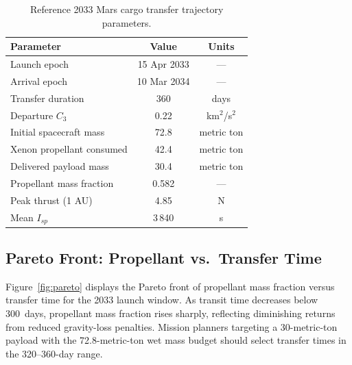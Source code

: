 \documentclass{aiaa-tc}
\begin{document}
\begin{table}[h]
  \centering
  \caption{Reference 2033 Mars cargo transfer trajectory parameters.}
  \label{tab:trajectory}
  \begin{tabular}{lcc}
    \toprule
    Parameter & Value & Units \\
    \midrule
    Launch epoch          & 15 Apr 2033  & --- \\
    Arrival epoch         & 10 Mar 2034  & --- \\
    Transfer duration     & 360          & days \\
    Departure $C_3$       & 0.22         & km$^2$/s$^2$ \\
    Initial spacecraft mass & 72.8       & metric ton \\
    Xenon propellant consumed & 42.4     & metric ton \\
    Delivered payload mass  & 30.4       & metric ton \\
    Propellant mass fraction & 0.582     & --- \\
    Peak thrust (1 AU)    & 4.85         & N \\
    Mean $I_{sp}$         & 3\,840       & s \\
    \bottomrule
  \end{tabular}
\end{table}

\subsection{Pareto Front: Propellant vs.\ Transfer Time}

Figure~\ref{fig:pareto} displays the Pareto front of propellant mass fraction
versus transfer time for the 2033 launch window.  As transit time decreases
below 300~days, propellant mass fraction rises sharply, reflecting diminishing
returns from reduced gravity-loss penalties.  Mission planners targeting a
30-metric-ton payload with the 72.8-metric-ton wet mass budget should select
transfer times in the 320–360-day range.
\end{document}
